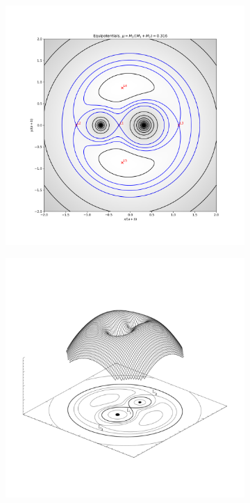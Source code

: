 \documentclass[../../main/thesis_msc.tex]{subfiles}
\begin{document}
				\begin{figure}[h]
   					\centering
    				\begin{subfigure}[h]{0.45\textwidth}
        				\centering
       					 \includegraphics[width = \linewidth]{../figures/chapter1/equipotentials_mu_0.316.png} 
    				\end{subfigure}
    				\hspace{0.1cm}
    				\begin{subfigure}[h]{0.45\textwidth}
        				\centering
        				\includegraphics[width = \linewidth]{../figures/chapter1/3Dequipotentials_transparent.png} 

\end{subfigure}
\end{figure}
\end{document}
